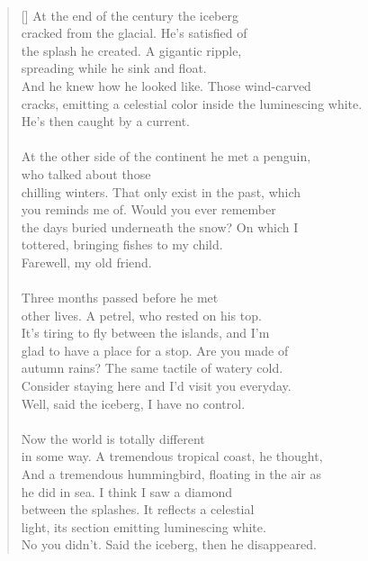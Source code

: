 \documentclass{book}
\begin{document}
\newpage
\poemtitle{\textcolor[RGB]{175,25,25}{The penguin, the petrel, \\the hummingbird and the iceberg}}
\hspace*{\fill} \\
\settowidth{\versewidth}{cracks, emitting a celestial color inside the luminescing white.}
\begin{verse}[\versewidth]
    At the end of the century the iceberg\\
    cracked from the glacial. He's satisfied of\\
    the splash he created. A gigantic ripple, \\
    spreading while he sink and float. \\
    And he knew how he looked like. Those wind-carved\\
    cracks, emitting a celestial color inside the luminescing white.\\
    He's then caught by a current. \\
    \hspace*{\fill} \\
    At the other side of the continent he met a penguin, \\
    who talked about those\\
    chilling winters. That only exist in the past, which\\
    you reminds me of. Would you ever remember \\
    the days buried underneath the snow? On which I\\
    tottered, bringing fishes to my child.\\
    Farewell, my old friend.\\
    \hspace*{\fill} \\
    Three months passed before he met\\
    other lives. A petrel, who rested on his top.\\
    It's tiring to fly between the islands, and I'm\\
    glad to have a place for a stop. Are you made of\\
    autumn rains? The same tactile of watery cold.\\
    Consider staying here and I'd visit you everyday.\\
    Well, said the iceberg, I have no control.\\
    \hspace*{\fill} \\
    Now the world is totally different\\
    in some way. A tremendous tropical coast, he thought,\\
    And a tremendous hummingbird, floating in the air as \\
    he did in sea. I think I saw a diamond \\
    between the splashes. It reflects a celestial\\
    light, its section emitting luminescing white. \\
    No you didn't. Said the iceberg, then he disappeared.\\
\end{verse}
\end{document}
